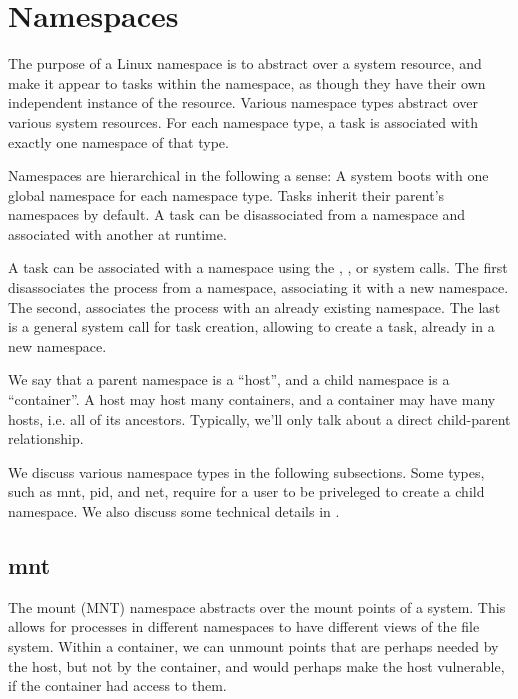 
\section{Namespaces}

\label{section:sandboxing:namespaces}

The purpose of a Linux namespace is to abstract over a system resource, and
make it appear to tasks within the namespace, as though they have their own
independent instance of the resource. Various namespace types abstract over
various system resources. For each namespace type, a task is associated with
exactly one namespace of that type.

Namespaces are hierarchical in the following a sense: A system boots with one
global namespace for each namespace type.  Tasks inherit their parent's
namespaces by default. A task can be disassociated from a namespace and
associated with another at runtime.

A task can be associated with a namespace using the \cite{man-2-unshare},
\cite{man-2-setns}, or \cite{man-2-clone} system calls.  The first
disassociates the process from a namespace, associating it with a new
namespace. The second, associates the process with an already existing
namespace. The last is a general system call for task creation, allowing to
create a task, already in a new namespace.

We say that a parent namespace is a ``host'', and a child namespace is a
``container''. A host may host many containers, and a container may have many
hosts, i.e. all of its ancestors. Typically, we'll only talk about a direct
child-parent relationship.

We discuss various namespace types in the following subsections. Some types,
such as mnt, pid, and net, require for a user to be priveleged to create a
child namespace. We also discuss some technical details in
.

\subsection{mnt}

\label{section:namespaces:mnt}

The mount (MNT) namespace abstracts over the mount points of a system. This
allows for processes in different namespaces to have different views of the
file system. Within a container, we can unmount points that are perhaps needed
by the host, but not by the container, and would perhaps make the host
vulnerable, if the container had access to them.


